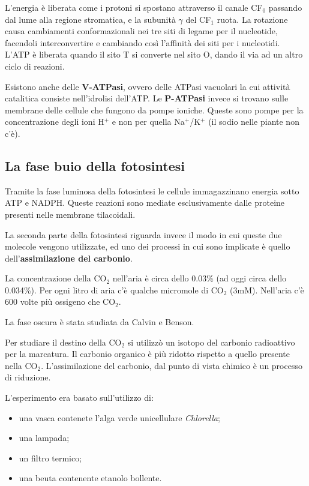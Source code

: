 \documentclass[]{article}
\begin{document}
L'energia è liberata come i protoni si spostano attraverso il canale
CF$_0$ passando dal lume alla regione stromatica, e la subunità $\gamma$
del CF$_1$ ruota. La rotazione causa cambiamenti conformazionali nei tre
siti di legame per il nucleotide, facendoli interconvertire e cambiando
così l'affinità dei siti per i nucleotidi. L'ATP è liberata quando il
sito T si converte nel sito O, dando il via ad un altro ciclo di
reazioni.

Esistono anche delle \textbf{V-ATPasi}, ovvero delle ATPasi vacuolari la
cui attività catalitica consiste nell'idrolisi dell'ATP. Le
\textbf{P-ATPasi} invece si trovano sulle membrane delle cellule che
fungono da pompe ioniche. Queste sono pompe per la concentrazione degli
ioni H$^+$ e non per quella Na$^+$/K$^+$ (il sodio nelle piante non
c'è).

\subsection{La fase buio della
fotosintesi}\label{la-fase-buio-della-fotosintesi}

Tramite la fase luminosa della fotosintesi le cellule immagazzinano
energia sotto ATP e NADPH. Queste reazioni sono mediate esclusivamente
dalle proteine presenti nelle membrane tilacoidali.

La seconda parte della fotosintesi riguarda invece il modo in cui queste
due molecole vengono utilizzate, ed uno dei processi in cui sono
implicate è quello dell'\textbf{assimilazione del carbonio}.

La concentrazione della CO$_2$ nell'aria è circa dello 0.03\% (ad oggi
circa dello 0.034\%). Per ogni litro di aria c'è qualche micromole di
CO$_2$ (3mM). Nell'aria c'è 600 volte più ossigeno che CO$_2$.

La fase oscura è stata studiata da Calvin e Benson.

Per studiare il destino della CO$_2$ si utilizzò un isotopo del carbonio
radioattivo per la marcatura. Il carbonio organico è più ridotto
rispetto a quello presente nella CO$_2$. L'assimilazione del carbonio,
dal punto di vista chimico è un processo di riduzione.

L'esperimento era basato sull'utilizzo di:

\begin{itemize}
\itemsep1pt\parskip0pt
\item
  una vasca contenete l'alga verde unicellulare \emph{Chlorella};
\item
  una lampada;
\item
  un filtro termico;
\item
  una beuta contenente etanolo bollente.
\end{itemize}
\end{document}
